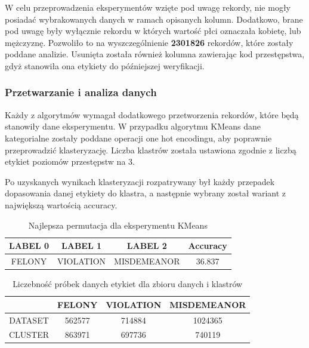 \documentclass{classrep}
\begin{document}
{{{                W celu przeprowadzenia eksperymentów wzięte pod uwagę rekordy, nie
                mogły posiadać wybrakowanych danych w ramach opisanych kolumn.
                Dodatkowo, brane pod uwagę były wyłącznie rekordu w których wartość
                płci oznaczała kobietę, lub mężczyznę. Pozwoliło to na wyszczególnienie
                \textbf{2301826} rekordów, które zostały poddane analizie. Usunięta
                została również kolumna zawierając kod przestępstwa, gdyż stanowiła ona
                etykiety do późniejszej weryfikacji.
            }

            \subsubsection{Przetwarzanie i analiza danych} {
                Każdy z algorytmów wymagał dodatkowego przetworzenia rekordów, które
                będą stanowiły dane eksperymentu. W przypadku algorytmu KMeans dane
                kategorialne zostały poddane operacji one hot encodingu, aby poprawnie
                przeprowadzić klasteryzację. Liczba klastrów została ustawiona zgodnie
                z liczbą etykiet poziomów przestępstw na 3.

                Po uzyskanych wynikach klasteryzacji rozpatrywany był każdy przepadek
                dopasowania danej etykiety do klastra, a następnie wybrany został
                wariant z największą wartością accuracy.
                
                \begin{table}[!htbp]
                \centering
                \begin{tabular}{|c|c|c|c|}
                    \hline
                    LABEL 0 & LABEL 1 & LABEL 2 & Accuracy \\ \hline
                    FELONY  & VIOLATION  & MISDEMEANOR & 36.837 \\
                    \hline
                \end{tabular}
                \caption{Najlepsza permutacja dla eksperymentu KMeans}
                \label{tab:kmeans_lab}
                \end{table}
                
                \begin{table}[!htbp]
                \centering
                \begin{tabular}{|c|c|c|c|}
                    \hline
                    & FELONY  & VIOLATION  & MISDEMEANOR \\ \hline
                    DATASET & 562577 & 714884 & 1024365 \\
                    CLUSTER & 863971 & 697736 & 740119 \\ 
                    \hline
                \end{tabular}
                \caption{Liczebność próbek danych etykiet dla zbioru danych i klastrów}
                \label{tab:kmeans_samples}
                \end{table}
                
}}}
\end{document}
